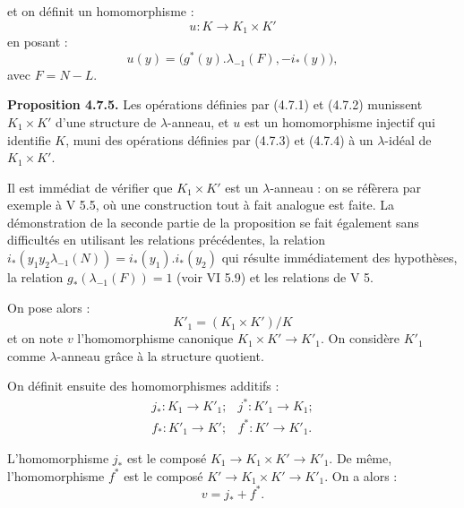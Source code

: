 et on
définit un homomorphisme :
\[
  u:K\longrightarrow K_1\times K'
\]
en posant :
\[
  u(y)=\bigl(g^*(y).\lambda_{-1}(F),-i_*(y)\bigr),
\]
avec \(F=N-L\).

\textbf{Proposition 4.7.5.} Les opérations définies par (4.7.1) et (4.7.2) munissent \(K_1\times K'\) d'une structure de \(\lambda\)-anneau, et \(u\) est un homomorphisme injectif qui identifie \(K\), muni des opérations définies par (4.7.3) et (4.7.4) à un \(\lambda\)-idéal de \(K_1\times K'\).

Il est immédiat de vérifier que \(K_1\times K'\) est un \(\lambda\)-anneau : on se réfèrera par exemple à V 5.5, où une construction tout à fait analogue est faite. La démonstration de la seconde partie de la proposition se fait également sans difficultés en utilisant les relations précédentes, la relation \(i_*(y_1y_2\lambda_{-1}(N))=i_*(y_1).i_*(y_2)\) qui résulte immédiatement des hypothèses, la relation \(g_*(\lambda_{-1}(F))=1\) (voir VI 5.9) et les relations de V 5.

On pose alors :
\[
  K'_1=(K_1\times K')/K
\]
et on note \(v\) l'homomorphisme canonique \(K_1\times K'\to K'_1\). On considère \(K'_1\) comme \(\lambda\)-anneau grâce à la structure quotient.

On définit ensuite des homomorphismes additifs :
\[
\begin{array}{llll}
j_*:K_1\to K'_1; & j^*:K'_1\to K_1; \\
f_*:K'_1\to K'; & f^*:K'\to K'_1 .
\end{array}
\]

L'homomorphisme \(j_*\) est le composé \(K_1\to K_1\times K'\to K'_1\). De même, l'homomorphisme \(f^*\) est le composé \(K'\to K_1\times K'\to K'_1\). On a alors :
\[
  v=j_*+f^*.
\]
